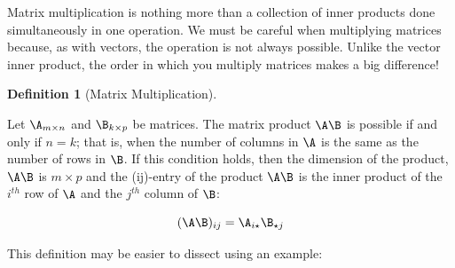 \documentclass[
]{article}
\theoremstyle{definition}
\newtheorem{definition}{Definition}[section]
\theoremstyle{definition}
\theoremstyle{definition}
\theoremstyle{definition}
\theoremstyle{remark}
\begin{document}
Matrix multiplication is nothing more than a collection of inner products done simultaneously in one operation. We must be careful when multiplying matrices because, as with vectors, the operation is not always possible. Unlike the vector inner product, the order in which you multiply matrices makes a big difference!

\begin{definition}[Matrix Multiplication]
\protect\hypertarget{def:matmultdef}{}\label{def:matmultdef}

Let \(\A_{m\times n}\) and \(\B_{k\times p}\) be matrices. The matrix product \(\A\B\) is possible if and only if \(n=k\); that is, when the number of columns in \(\A\) is the same as the number of rows in \(\B\). If this condition holds, then the dimension of the product, \(\A\B\) is \(m\times p\) and the (ij)-entry of the product \(\A\B\) is the inner product of the \(i^{th}\) row of \(\A\) and the \(j^{th}\) column of \(\B\):

\[(\A\B)_{ij} = \A_{i\star}\B_{\star j}\]

\end{definition}

This definition may be easier to dissect using an example:
\end{document}
